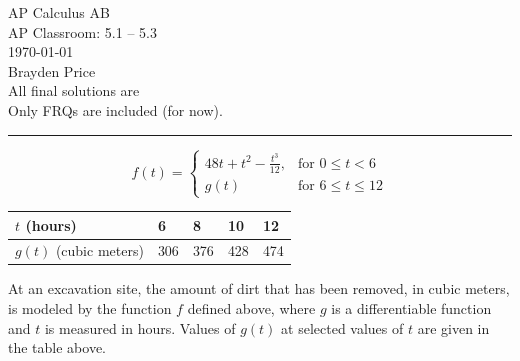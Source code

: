 \documentclass[12pt,letterpaper, onecolumn]{exam}
\begin{document}
	
	\begingroup  
	\centering
	\LARGE AP Calculus AB\\
	\LARGE AP Classroom: 5.1 -- 5.3\\[0.5em]
	\large \today\\[0.5em]
	\large Brayden Price \\
	All final solutions are  \\
	Only FRQs are included (for now). \\
	\endgroup
	\rule{\textwidth}{0.4pt}
	
	\listofexercises
	\clearpage
	
	\printanswers
	\renewcommand{\solutiontitle}{\noindent\textbf{Solution:}\enspace}   %
	
	\begin{questions}
		
		\question 
		$$f(t) = \begin{cases}
			 48t + t^2 - \frac{t^3}{12}, & \text{for } 0 \leq t < 6 \\
			 g(t)						 & \text{for } 6 \leq t \leq 12
		\end{cases}$$
		\begin{center}\begin{tabular}{|l||l|l|l|l|}
			\hline
			$t$ (hours)           & 6   & 8   & 10  & 12  \\ \hline
			$g(t)$ (cubic meters) & 306 & 376 & 428 & 474 \\ \hline
		\end{tabular}\end{center}
		At an excavation site, the amount of dirt that has been removed, in cubic meters, is modeled by the function $f$ defined above, where $g$ is a differentiable function and $t$ is measured in hours. Values of $g(t)$ at selected values of $t$ are given in the table above.
\end{questions}
\end{document}
